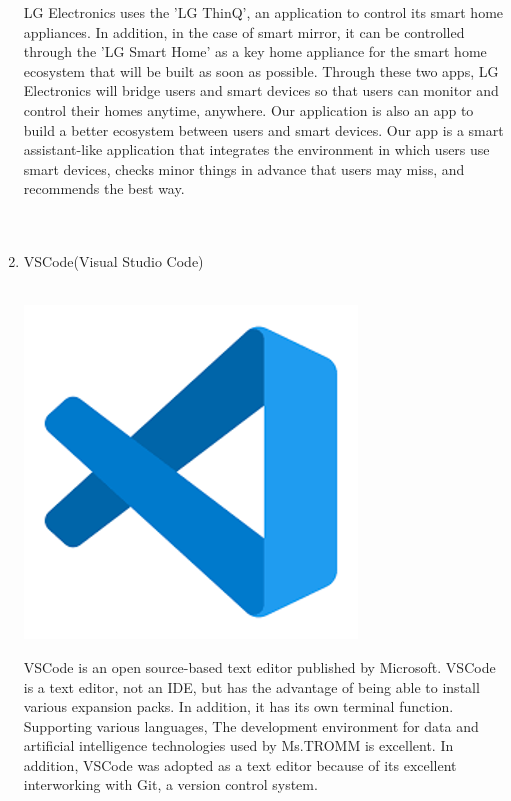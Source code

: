 \documentclass[conference]{IEEEtran}
\begin{document}
\begin{enumerate}
        LG Electronics uses the 'LG ThinQ', an application to control its smart home appliances. In addition, in the case of smart mirror, it can be controlled through the 'LG Smart Home' as a key home appliance for the smart home ecosystem that will be built as soon as possible. Through these two apps, LG Electronics will bridge users and smart devices so that users can monitor and control their homes anytime, anywhere. Our application is also an app to build a better ecosystem between users and smart devices. Our app is a smart assistant-like application that integrates the environment in which users use smart devices, checks minor things in advance that users may miss, and recommends the best way. \\ \\
    \\ 
    \item VSCode(Visual Studio Code) \\ \\
\centerline{\includegraphics{vs.png}}
VSCode is an open source-based text editor published by Microsoft. VSCode is a text editor, not an IDE, but has the advantage of being able to install various expansion packs. In addition, it has its own terminal function. Supporting various languages, The development environment for data and artificial intelligence technologies used by Ms.TROMM is excellent. In addition, VSCode was adopted as a text editor because of its excellent interworking with Git, a version control system.\\ \\ \\ \\ \\ \\ \\ \\ \\ \\ \\ \\ \\ \\

\end{enumerate}
\end{document}
